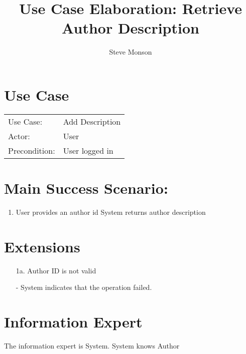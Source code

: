 \documentclass{article}
\title{Use Case Elaboration: Retrieve Author Description}
\author{ Steve Monson }
\begin{document}
\maketitle


\section*{Use Case}
\begin{tabular}{l l}
Use Case:     & Add Description\\
Actor:        & User\\
Precondition: & User logged in\\
\end{tabular}


\section*{Main Success Scenario:}

\begin{enumerate}
    \item User provides an author id
    \itme System returns author description
 
\end{enumerate}

\section*{Extensions}

\begin{itemize}
    \item [1a.] Author ID is not valid
    
         - System indicates that the operation failed.
                            
\end{itemize}


\section*{Information Expert}
The information expert is System. System knows Author
\end{document}
